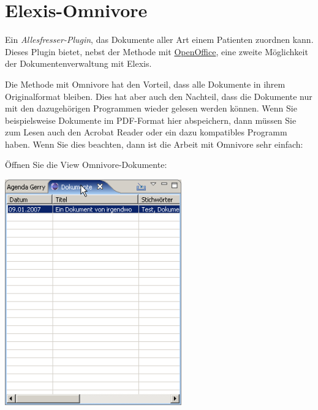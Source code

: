 
\section{Elexis-Omnivore}
Ein \textit{Allesfresser-Plugin}, das Dokumente aller Art einem Patienten zuordnen kann. Dieses Plugin bietet, nebst der Methode mit \href{http://www.elexis.ch/jp/index.php?option=content&task=view&id=107}{OpenOffice}, eine zweite Möglichkeit der Dokumentenverwaltung mit Elexis.

Die Methode mit Omnivore hat den Vorteil, dass alle Dokumente in ihrem Originalformat bleiben. Dies hat aber auch den Nachteil, dass die Dokumente nur mit den dazugehörigen Programmen wieder gelesen werden können. Wenn Sie beispielsweise Dokumente im PDF-Format  hier abspeichern, dann müssen Sie zum Lesen auch den Acrobat Reader oder ein dazu kompatibles Programm haben. Wenn Sie dies beachten, dann ist die Arbeit mit Omnivore sehr einfach:

Öffnen Sie die View Omnivore-Dokumente:

\includegraphics[width=3in]{images/omnivore1}

